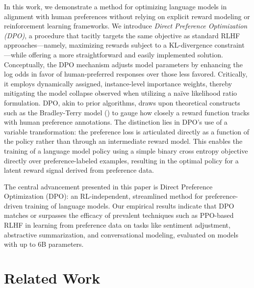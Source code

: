 In this work, we demonstrate a method for optimizing language models in alignment with human preferences without relying on explicit reward modeling or reinforcement learning frameworks. We introduce \textit{{Direct Preference Optimization} (DPO)}, a procedure that tacitly targets the same objective as standard RLHF approaches—namely, maximizing rewards subject to a KL-divergence constraint—while offering a more straightforward and easily implemented solution. Conceptually, the DPO mechanism adjusts model parameters by enhancing the log odds in favor of human-preferred responses over those less favored. Critically, it employs dynamically assigned, instance-level importance weights, thereby mitigating the model collapse observed when utilizing a naïve likelihood ratio formulation. DPO, akin to prior algorithms, draws upon theoretical constructs such as the Bradley-Terry model (\cite{bradley1952rankanalysis}) to gauge how closely a reward function tracks with human preference annotations. The distinction lies in DPO’s use of a variable transformation: the preference loss is articulated directly as a function of the policy rather than through an intermediate reward model. This enables the training of a language model policy using a simple binary cross entropy objective directly over preference-labeled examples, resulting in the optimal policy for a latent reward signal derived from preference data.

The central advancement presented in this paper is Direct Preference Optimization (DPO): an RL-independent, streamlined method for preference-driven training of language models. Our empirical results indicate that DPO matches or surpasses the efficacy of prevalent techniques such as PPO-based RLHF in learning from preference data on tasks like sentiment adjustment, abstractive summarization, and conversational modeling, evaluated on models with up to 6B parameters.

\section{Related Work}

